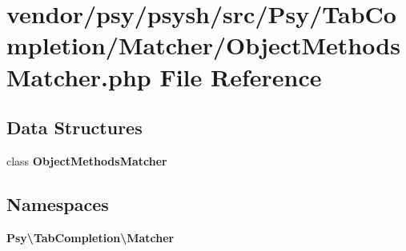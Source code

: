 \section{vendor/psy/psysh/src/\+Psy/\+Tab\+Completion/\+Matcher/\+Object\+Methods\+Matcher.php File Reference}
\label{_object_methods_matcher_8php}
\subsection*{Data Structures}
\begin{DoxyCompactItemize}
\item 
class {\bf Object\+Methods\+Matcher}
\end{DoxyCompactItemize}
\subsection*{Namespaces}
\begin{DoxyCompactItemize}
\item 
 {\bf Psy\textbackslash{}\+Tab\+Completion\textbackslash{}\+Matcher}
\end{DoxyCompactItemize}
